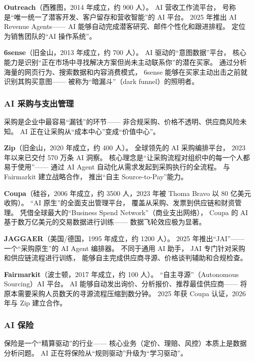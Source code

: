 \textbf{Outreach}（西雅图，2014 年成立，约 900 人）。
AI 营收工作流平台，
号称是``唯一统一了潜客开发、客户留存和营收智能''的 AI 平台。
2025 年推出 AI Revenue Agents——
AI 能够自动完成潜客研究、邮件个性化和跟进排程。
定位为销售团队的``AI 操作系统''。

\textbf{6sense}（旧金山，2013 年成立，约 700 人）。
AI 驱动的``意图数据''平台，
核心能力是识别``正在市场中寻找解决方案但尚未主动联系你''的潜在买家。
通过分析海量的网页行为、搜索数据和内容消费模式，
6sense 能够在买家主动出击之前就识别其购买意图——
被称为``暗漏斗''（dark funnel）的照明者。

\subsubsection{AI 采购与支出管理}

采购是企业中最容易``漏钱''的环节——
非合规采购、价格不透明、供应商风险未知。
AI 正在让采购从``成本中心''变成``价值中心''。

\textbf{Zip}（旧金山，2020 年成立，约 400 人）。
全球领先的 AI 采购编排平台，
2023 年以来已交付 570 万条 AI 洞察。
核心理念是``让采购流程对组织中的每一个人都易于使用''——
通过 AI Agent 自动化从需求发起到采购执行的全流程。
与 Fairmarkit 建立战略合作，
推出``自主 Source-to-Pay''能力。

\textbf{Coupa}（硅谷，2006 年成立，约 3500 人，2023 年被 Thoma Bravo 以 80 亿美元收购）。
``AI 原生''的全面支出管理平台，
覆盖从采购、发票到供应链和财资管理。
凭借全球最大的``Business Spend Network''（商业支出网络），
Coupa 的 AI 基于数万亿美元的交易数据进行训练——
数据飞轮效应极为显著。

\textbf{JAGGAER}（美国/德国，1995 年成立，约 1200 人）。
2025 年推出``JAI''——
一个``采购原生''的 AI Agent 编排器。
不同于通用 AI 助手，
JAI 专门针对采购和供应链流程进行训练，
能够自主完成供应商寻源、价格谈判辅助和合规检查。

\textbf{Fairmarkit}（波士顿，2017 年成立，约 100 人）。
``自主寻源''（Autonomous Sourcing）AI 平台。
AI 能够自动发出询价、分析报价、推荐最佳供应商——
将原本需要采购人员数天的寻源流程压缩到数分钟。
2025 年获 Coupa 认证，2026 年与 Zip 建立合作。

\subsubsection{AI 保险}

保险是一个``精算驱动''的行业——
核心业务（定价、理赔、风控）本质上是数据分析问题。
AI 正在将保险从``规则驱动''升级为``学习驱动''。

